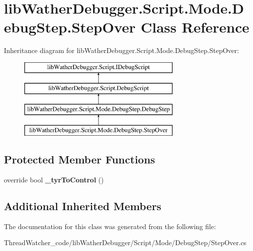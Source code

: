 \hypertarget{classlib_wather_debugger_1_1_script_1_1_mode_1_1_debug_step_1_1_step_over}{\section{lib\+Wather\+Debugger.\+Script.\+Mode.\+Debug\+Step.\+Step\+Over Class Reference}
\label{classlib_wather_debugger_1_1_script_1_1_mode_1_1_debug_step_1_1_step_over}
}
Inheritance diagram for lib\+Wather\+Debugger.\+Script.\+Mode.\+Debug\+Step.\+Step\+Over\+:\begin{figure}[H]
\begin{center}
\leavevmode
\includegraphics[height=4.000000cm]{classlib_wather_debugger_1_1_script_1_1_mode_1_1_debug_step_1_1_step_over}
\end{center}
\end{figure}
\subsection*{Protected Member Functions}
\begin{DoxyCompactItemize}
\item 
\hypertarget{classlib_wather_debugger_1_1_script_1_1_mode_1_1_debug_step_1_1_step_over_af236fdbff520a372a589f4519538c74b}{override bool {\bfseries \+\_\+tyr\+To\+Control} ()}\label{classlib_wather_debugger_1_1_script_1_1_mode_1_1_debug_step_1_1_step_over_af236fdbff520a372a589f4519538c74b}

\end{DoxyCompactItemize}
\subsection*{Additional Inherited Members}


The documentation for this class was generated from the following file\+:\begin{DoxyCompactItemize}
\item 
Thread\+Watcher\+\_\+code/lib\+Wather\+Debugger/\+Script/\+Mode/\+Debug\+Step/Step\+Over.\+cs\end{DoxyCompactItemize}
